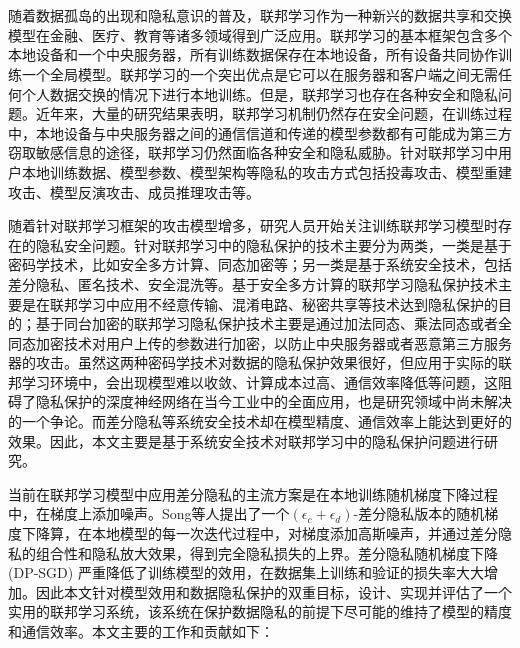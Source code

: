 \vspace{-2.5cm}
\chapter*{}

随着数据孤岛的出现和隐私意识的普及，联邦学习作为一种新兴的数据共享和交换模型在金融、医疗、教育等诸多领域得到广泛应用。联邦学习的基本框架包含多个本地设备和一个中央服务器，所有训练数据保存在本地设备，所有设备共同协作训练一个全局模型。联邦学习的一个突出优点是它可以在服务器和客户端之间无需任何个人数据交换的情况下进行本地训练。但是，联邦学习也存在各种安全和隐私问题。近年来，大量的研究结果表明，联邦学习机制仍然存在安全问题，在训练过程中，本地设备与中央服务器之间的通信信道和传递的模型参数都有可能成为第三方窃取敏感信息的途径，联邦学习仍然面临各种安全和隐私威胁。针对联邦学习中用户本地训练数据、模型参数、模型架构等隐私的攻击方式包括投毒攻击、模型重建攻击、模型反演攻击、成员推理攻击等。

随着针对联邦学习框架的攻击模型增多，研究人员开始关注训练联邦学习模型时存在的隐私安全问题。针对联邦学习中的隐私保护的技术主要分为两类，一类是基于密码学技术，比如安全多方计算、同态加密等；另一类是基于系统安全技术，包括差分隐私、匿名技术、安全混洗等。基于安全多方计算的联邦学习隐私保护技术主要是在联邦学习中应用不经意传输、混淆电路、秘密共享等技术达到隐私保护的目的；基于同台加密的联邦学习隐私保护技术主要是通过加法同态、乘法同态或者全同态加密技术对用户上传的参数进行加密，以防止中央服务器或者恶意第三方服务器的攻击。虽然这两种密码学技术对数据的隐私保护效果很好，但应用于实际的联邦学习环境中，会出现模型难以收敛、计算成本过高、通信效率降低等问题，这阻碍了隐私保护的深度神经网络在当今工业中的全面应用，也是研究领域中尚未解决的一个争论。而差分隐私等系统安全技术却在模型精度、通信效率上能达到更好的效果。因此，本文主要是基于系统安全技术对联邦学习中的隐私保护问题进行研究。

当前在联邦学习模型中应用差分隐私的主流方案是在本地训练随机梯度下降过程中，在梯度上添加噪声。Song等人提出了一个$\left(\epsilon_{c}+\epsilon_{d}\right)$-差分隐私版本的随机梯度下降算，在本地模型的每一次迭代过程中，对梯度添加高斯噪声，并通过差分隐私的组合性和隐私放大效果，得到完全隐私损失的上界。差分隐私随机梯度下降 (DP-SGD) 严重降低了训练模型的效用，在数据集上训练和验证的损失率大大增加。因此本文针对模型效用和数据隐私保护的双重目标，设计、实现并评估了一个实用的联邦学习系统，该系统在保护数据隐私的前提下尽可能的维持了模型的精度和通信效率。本文主要的工作和贡献如下：

